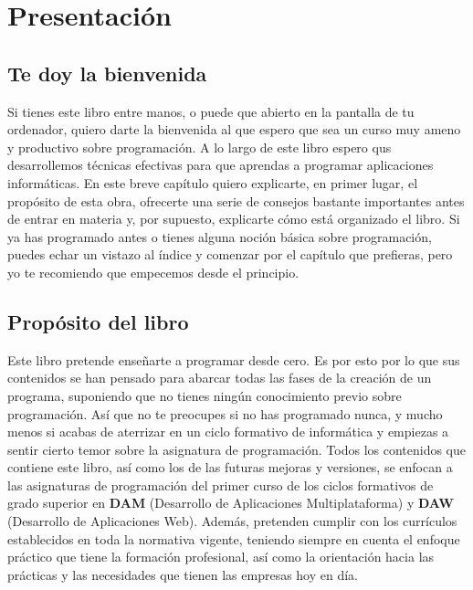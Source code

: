 
\chapter{Presentación}

\section{Te doy la bienvenida}

Si tienes este libro entre manos, o puede que abierto en la pantalla de tu ordenador, quiero darte la bienvenida al que espero que 
sea un curso muy ameno y productivo sobre programación. A lo largo de este libro espero qus desarrollemos técnicas efectivas
para que aprendas a programar aplicaciones informáticas. En este breve capítulo quiero explicarte, en primer lugar, el propósito de esta
obra, ofrecerte una serie de consejos bastante importantes antes de entrar en materia y, por supuesto, explicarte cómo está organizado
el libro. Si ya has programado antes o tienes alguna noción básica sobre programación, puedes echar un vistazo al índice y comenzar
por el capítulo que prefieras, pero yo te recomiendo que empecemos desde el principio. 

\section{Propósito del libro}

Este libro pretende enseñarte a programar desde cero. Es por esto por lo que sus contenidos se han pensado para abarcar todas las fases
de la creación de un programa, suponiendo que no tienes ningún conocimiento previo sobre programación. Así que no te preocupes si no
has programado nunca, y mucho menos si acabas de aterrizar en un ciclo formativo de informática y empiezas a sentir cierto temor sobre
la asignatura de programación. Todos los contenidos que contiene este libro, así como los de las futuras mejoras y versiones, se 
enfocan a las asignaturas de programación del primer curso de los ciclos formativos de grado superior en \textbf{DAM} (Desarrollo de 
Aplicaciones Multiplataforma) y \textbf{DAW} (Desarrollo de Aplicaciones Web). Además, pretenden cumplir con los currículos establecidos en toda
la normativa vigente, teniendo siempre en cuenta el enfoque práctico que tiene la formación profesional, así como la orientación
hacia las prácticas y las necesidades que tienen las empresas hoy en día.

